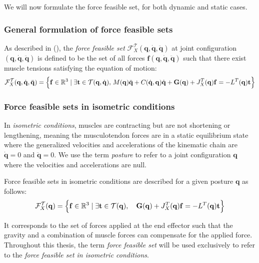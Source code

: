 We will now formulate the force feasible set, for both dynamic and static cases.

\subsubsection*{General formulation of force feasible sets}
As described in (\cite{skuricCoupledViewPhysical}), the \emph{force feasible set} $\mathcal{F}_X^{\mathcal{T}}(\mathbf{q}, \dot{\mathbf{q}}, \ddot{\mathbf{q}})$ at joint configuration $(\mathbf{q}, \dot{\mathbf{q}}, \ddot{\mathbf{q}})$ is defined to be the set of all forces $\mathbf{f}(\mathbf{q}, \dot{\mathbf{q}}, \ddot{\mathbf{q}})$ such that there exist muscle tensions satisfying the equation of motion:
\begin{align*}
    \mathcal{F}_X^{\mathcal{T}}(\mathbf{q}, \dot{\mathbf{q}}, \ddot{\mathbf{q}}) = \left\{\mathbf{f}\in\mathbb{R}^3 \mid \exists \mathbf{t}\in \mathcal{T}(\mathbf{q}, \dot{\mathbf{q}}),\, M(\mathbf{q})\ddot{\mathbf{q}} + C(\dot{\mathbf{q}}, \mathbf{q})\dot{\mathbf{q}} + \mathbf{G}(\mathbf{q}) + J_X^T(\mathbf{q})\mathbf{f} = -L^T(\mathbf{q})\mathbf{t}\right\}
\end{align*}

\subsubsection*{Force feasible sets in isometric conditions}
In \emph{isometric conditions}, muscles are contracting but are not shortening or lengthening, meaning the musculotendon forces are in a static equilibrium state where the generalized velocities and accelerations of the kinematic chain are $\dot{\mathbf{q}}=0$ and $\ddot{\mathbf{q}} = 0$. We use the term \emph{posture} to refer to a joint configuration $\mathbf{q}$ where the velocities and accelerations are null.

Force feasible sets in isometric conditions are described for a given posture $\mathbf{q}$ as follows:
\begin{align*}
    \mathcal{F}_X^{\mathcal{T}}(\mathbf{q}) = \left\{\mathbf{f}\in\mathbb{R}^3 \mid \exists \mathbf{t}\in \mathcal{T}(\mathbf{q}), \quad \mathbf{G}(\mathbf{q}) + J_X^T(\mathbf{q})\mathbf{f} = -L^T(\mathbf{q})\mathbf{t} \right\}
\end{align*}

It corresponds to the set of forces applied at the end effector such that the gravity and a combination of muscle forces can compensate for the applied force. Throughout this thesis, the term \emph{force feasible set} will be used exclusively to refer to the \emph{force feasible set in isometric conditions}. 

